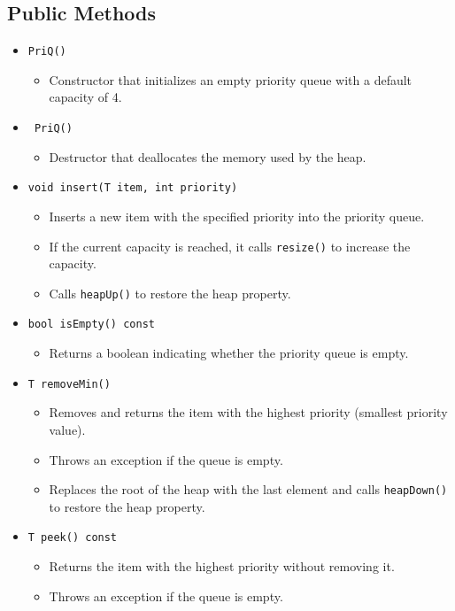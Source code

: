 \documentclass{article}
\begin{document}
\subsection{Public Methods}
\begin{itemize}
    \item \texttt{PriQ()}
    \begin{itemize}
        \item Constructor that initializes an empty priority queue with a default capacity of 4.
    \end{itemize}

    \item \texttt{~PriQ()}
    \begin{itemize}
        \item Destructor that deallocates the memory used by the heap.
    \end{itemize}

    \item \texttt{void insert(T item, int priority)}
    \begin{itemize}
        \item Inserts a new item with the specified priority into the priority queue.
        \item If the current capacity is reached, it calls \texttt{resize()} to increase the capacity.
        \item Calls \texttt{heapUp()} to restore the heap property.
    \end{itemize}

    \item \texttt{bool isEmpty() const}
    \begin{itemize}
        \item Returns a boolean indicating whether the priority queue is empty.
    \end{itemize}

    \item \texttt{T removeMin()}
    \begin{itemize}
        \item Removes and returns the item with the highest priority (smallest priority value).
        \item Throws an exception if the queue is empty.
        \item Replaces the root of the heap with the last element and calls \texttt{heapDown()} to restore the heap property.
    \end{itemize}

    \item \texttt{T peek() const}
    \begin{itemize}
        \item Returns the item with the highest priority without removing it.
        \item Throws an exception if the queue is empty.
    \end{itemize}


\end{itemize}
\end{document}
